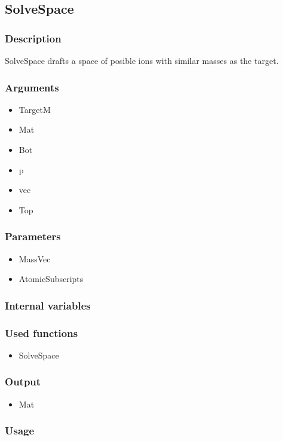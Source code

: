 \subsection{SolveSpace}
\subsubsection{Description}
SolveSpace drafts a space of posible ions with similar masses as the target.
\subsubsection{Arguments}
\begin{itemize}
\item TargetM
\item Mat
\item Bot
\item p
\item vec
\item Top
\end{itemize}
\subsubsection{Parameters}
\begin{itemize}
\item MassVec
\item AtomicSubscripts
\end{itemize}
\subsubsection{Internal variables}
\subsubsection{Used functions}
\begin{itemize}
\item SolveSpace
\end{itemize}
\subsubsection{Output}
\begin{itemize}
\item Mat
\end{itemize}
\subsubsection{Usage}


